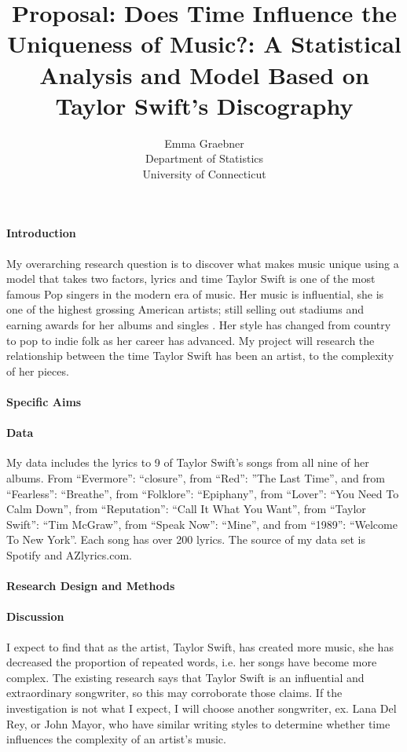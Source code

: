 \documentclass[12pt]{article}
\title{Proposal: Does Time Influence the Uniqueness of Music?: A Statistical Analysis and Model Based on Taylor Swift's Discography}
\author{Emma Graebner\\
  Department of Statistics\\
  University of Connecticut
}
\begin{document}
\maketitle


\paragraph{Introduction}
My overarching research question is to discover what makes music unique using a model that takes two factors, lyrics and time Taylor Swift is one of the most famous Pop singers in the modern era of music. Her music is influential, she is one of the highest grossing American artists; still selling out stadiums and earning awards for her albums and singles \citep{fogarty2021you} . Her style has changed from country to pop to indie folk as her career has advanced. My project will research the relationship between the time Taylor Swift has been an artist, to the complexity of her pieces. \citep{sloan2021taylor} 


\citep{perone2017words}

\paragraph{Specific Aims}


\paragraph{Data}
My data includes the lyrics to 9 of Taylor Swift’s songs from all nine of her albums. From “Evermore”: “closure”, from “Red”: ”The Last Time”, and from “Fearless”: “Breathe”, from “Folklore”: “Epiphany”, from “Lover”: “You Need To Calm Down”, from “Reputation”: “Call It What You Want”, from “Taylor Swift”: “Tim McGraw”, from “Speak Now”: “Mine”, and from “1989”: “Welcome To New York”. Each song has over 200 lyrics. The source of my data set is Spotify and AZlyrics.com.  
\paragraph{Research Design and Methods}


\paragraph{Discussion}
I expect to find that as the artist, Taylor Swift, has created more music, she has decreased the proportion of repeated words, i.e. her songs have become more complex. The existing research says that Taylor Swift is an influential and extraordinary songwriter, so this may corroborate those claims. If the investigation is not what I expect, I will choose another songwriter, ex. Lana Del Rey, or John Mayor, who have similar writing styles to determine whether time influences the complexity of an artist’s music. 
\end{document}
